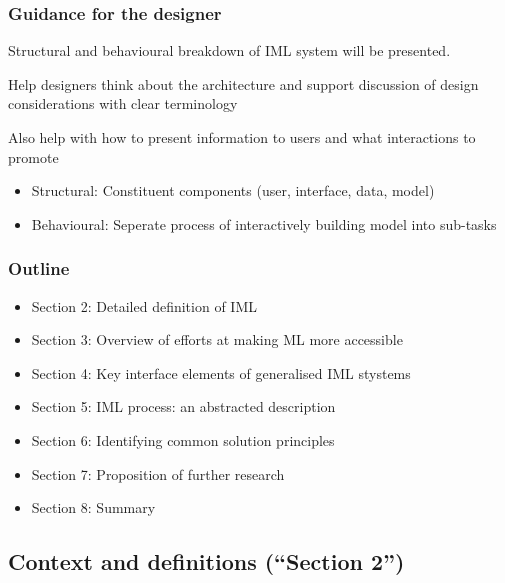 \documentclass[12pt,a4paper]{article}
\begin{document}
\subsubsection{Guidance for the designer}
Structural and behavioural breakdown of IML system will be presented.
\begin{description}
\item Help designers think about the architecture and support discussion of design considerations with clear terminology
\item Also help with how to present information to users and what interactions to promote
\end{description}
\begin{itemize}
\item Structural: Constituent components (user, interface, data, model)
\item Behavioural: Seperate process of interactively building model into sub-tasks
\end{itemize}
\subsubsection{Outline}
\begin{itemize}
\item Section 2: Detailed definition of IML
\item Section 3: Overview of efforts at making ML more accessible
\item Section 4: Key interface elements of generalised IML stystems
\item Section 5: IML process: an abstracted description
\item Section 6: Identifying common solution principles
\item Section 7: Proposition of further research
\item Section 8: Summary
\end{itemize}
\subsection{Context and definitions (``Section 2'')}
\end{document}
